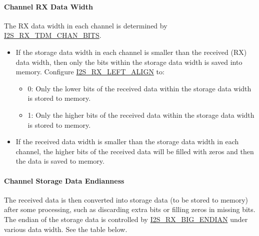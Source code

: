 \documentclass[main\_\_EN.tex]{subfiles}
\begin{document}
\paragraph{Channel RX Data Width} 

The RX data width in each channel is determined by \hyperref[fielddesc:I2SRXTDMCHANBITS]{I2S\_RX\_TDM\_CHAN\_BITS}.
\begin{itemize}
    \item If the storage data width in each channel is smaller than the received (RX) data width, then only the bits within the storage data width is saved into memory. Configure \hyperref[fielddesc:I2SRXLEFTALIGN]{I2S\_RX\_LEFT\_ALIGN} to:
        \begin{itemize}
        \item 0: Only the lower bits of the received data within the storage data width is stored to memory.
        \item 1: Only the higher bits of the received data within the storage data width is stored to memory.
        \end{itemize}
    \item If the received data width is smaller than the storage data width in each channel, the higher bits of the received data will be filled with zeros and then the data is saved to memory.
\end{itemize}

\paragraph{Channel Storage Data Endianness} 

The received data is then converted into storage data (to be stored to memory) after some processing, such as discarding extra bits or filling zeros in missing bits. The endian of the storage data is controlled by \hyperref[fielddesc:I2SRXBIGENDIAN]{I2S\_RX\_BIG\_ENDIAN} under various data width. See the table below.
\end{document}
